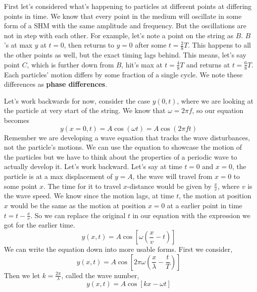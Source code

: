 First let's considered what's happening to particles at different points at differing points in time. We know that every point in the medium will oscillate in some form of a SHM with the same amplitude and frequency. But the oscillations are not in step with each other. For example, let's note a point on the string as $B$. $B$'s at max $y$ at $t=0$, then returns to $y=0$ after some $t=\frac{2}{8}T$. This happens to all the other points as well, but the exact timing lags behind. This means, let's say point $C$, which is further down from $B$, hit's max at $t=\frac{4}{8}T$ and returns at $t=\frac{6}{8}T$. Each particles' motion differs by some fraction of a single cycle. We note these differences as \textbf{phase differences}.

Let's work backwards for now, consider the case $y(0,t)$, where we are looking at the particle at very start of the string. We know that $\omega = 2\pi f$, so our equation becomes 
\begin{equation*}
	y(x=0,t) = A\cos(\omega t) = A\cos(2\pi ft)
\end{equation*}
Remember we are developing a wave equation that tracks the wave disturbances, not the particle's motions. We can use the equation to showcase the motion of the particles but we have to think about the properties of a periodic wave to actually develop it. Let's work backward. Let's say at time $t=0$ and $x=0$, the particle is at a max displacement of $y=A$, the wave will travel from $x=0$ to some point $x$. The time for it to travel $x$-distance would be given by $\frac{x}{v}$, where $v$ is the wave speed. We know since the motion lags, at time $t$, the motion at position $x$ would be the same as the motion at position $x=0$ at a earlier point in time $t=t-\frac{x}{v}$. So we can replace the original $t$ in our equation with the expression we got for the earlier time. 
\begin{equation*}
	y(x,t) = A\cos[\omega (\frac{x}{v} - t)]
\end{equation*}
We can write the equation down into more usable forms. First we consider, 
\begin{equation*}
	y(x,t) = A\cos[2\pi\omega(\frac{x}{\lambda}-\frac{t}{T})]
\end{equation*}
Then we let $k=\frac{2\pi}{\lambda}$, called the wave number, 
\begin{equation*}
	y(x,t) = A\cos[kx - \omega t]
\end{equation*}

